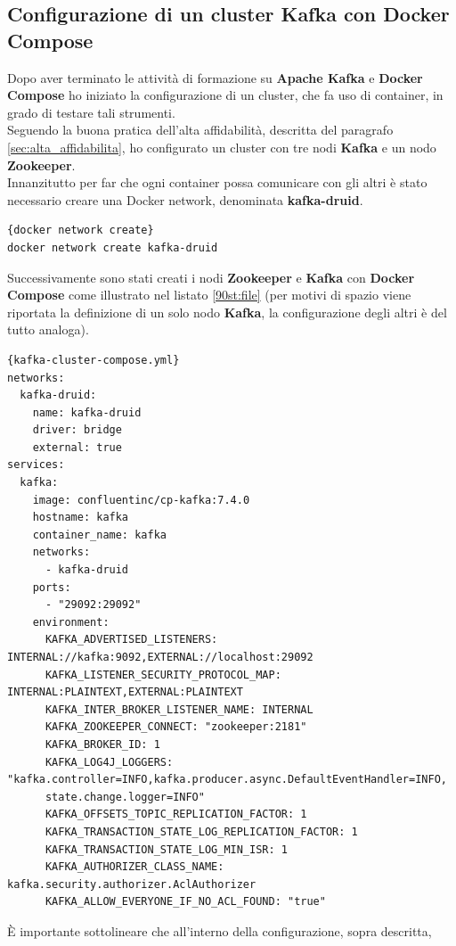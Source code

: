 \subsection{Configurazione di un cluster Kafka con Docker Compose}
Dopo aver terminato le attività di formazione su \textbf{Apache Kafka} e \textbf{Docker Compose} 
ho iniziato la configurazione di un \gls{cluster}{}, che fa uso di \gls{container}{}, in grado di testare tali strumenti.
\\Seguendo la buona pratica dell'alta affidabilità, descritta del 
paragrafo \ref{sec:alta_affidabilita}, ho configurato un \gls{cluster}{} con tre nodi \textbf{Kafka} e un nodo \textbf{Zookeeper}.\\
Innanzitutto per far che ogni \gls{container}{} possa comunicare con gli altri è stato necessario creare una 
\gls{Docker network}{}, denominata \textbf{kafka-druid}.
\begin{lstlisting}[caption=\texttt{docker network create}, label=1000st:file]{docker network create}
docker network create kafka-druid
\end{lstlisting}
Successivamente sono stati creati i nodi \textbf{Zookeeper} e \textbf{Kafka} con \textbf{Docker Compose} 
come illustrato nel listato \ref{90st:file} (per motivi di spazio viene riportata la definizione di un solo nodo \textbf{Kafka}, la configurazione degli altri è del tutto analoga).
\begin{lstlisting}[caption=\texttt{kafka-cluster-compose.yml}, label=90st:file]{kafka-cluster-compose.yml}
networks:
  kafka-druid:
    name: kafka-druid
    driver: bridge
    external: true
services:
  kafka:
    image: confluentinc/cp-kafka:7.4.0
    hostname: kafka
    container_name: kafka
    networks:
      - kafka-druid
    ports:
      - "29092:29092"
    environment:
      KAFKA_ADVERTISED_LISTENERS: INTERNAL://kafka:9092,EXTERNAL://localhost:29092
      KAFKA_LISTENER_SECURITY_PROTOCOL_MAP: INTERNAL:PLAINTEXT,EXTERNAL:PLAINTEXT
      KAFKA_INTER_BROKER_LISTENER_NAME: INTERNAL
      KAFKA_ZOOKEEPER_CONNECT: "zookeeper:2181"
      KAFKA_BROKER_ID: 1
      KAFKA_LOG4J_LOGGERS: "kafka.controller=INFO,kafka.producer.async.DefaultEventHandler=INFO,
      state.change.logger=INFO"
      KAFKA_OFFSETS_TOPIC_REPLICATION_FACTOR: 1
      KAFKA_TRANSACTION_STATE_LOG_REPLICATION_FACTOR: 1
      KAFKA_TRANSACTION_STATE_LOG_MIN_ISR: 1
      KAFKA_AUTHORIZER_CLASS_NAME: kafka.security.authorizer.AclAuthorizer
      KAFKA_ALLOW_EVERYONE_IF_NO_ACL_FOUND: "true"
\end{lstlisting}
È importante sottolineare che all'interno della configurazione, sopra descritta, 
